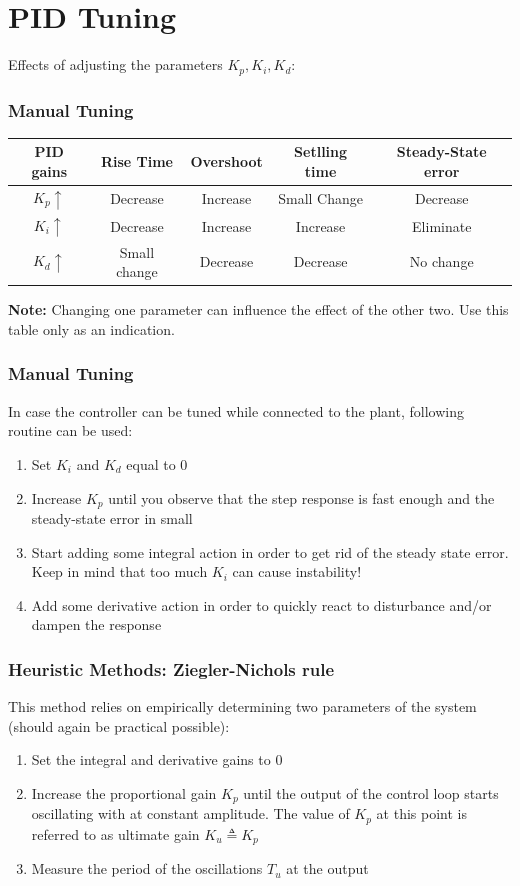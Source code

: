 \section{PID Tuning}

\begin{frame}
	Effects of adjusting the parameters $K_p, K_i, K_d$:
	\vspace{1em}
	\frametitle{Manual Tuning}
	{
	\small
	\begin{tabular}{c | c | c | c | c }
		PID gains	&	Rise Time 	&	Overshoot	&	Setlling time	&	Steady-State error \\
		\hline
		$K_p \uparrow$ & Decrease	&	Increase	&	Small Change	&	Decrease \\
		$K_i \uparrow$ & Decrease	&	Increase	&	Increase		&	Eliminate \\
		$K_d \uparrow$ & Small change &	Decrease	&	Decrease		&	No change \\
	\end{tabular}
	}
	\vspace{1em}
	
	\textbf{Note:} Changing one parameter can influence the effect of the other two. Use this table only as an indication.
\end{frame}

\begin{frame}
	\frametitle{Manual Tuning}
	In case the controller can be tuned while connected to the plant, following routine can be used:
	\begin{enumerate}
		\item Set $K_i$ and $K_d$ equal to 0
		\item Increase $K_p$ until you observe that the step response is fast enough and the steady-state error in small
		\item Start adding some integral action in order to get rid of the steady state error. Keep in mind that too much $K_i$ can cause instability!
		\item Add some derivative action in order to quickly react to disturbance and/or dampen the response
		
	\end{enumerate}
\end{frame}


\begin{frame}
	\frametitle{Heuristic Methods: Ziegler-Nichols rule}
		This method relies on empirically determining two parameters of the system (should again be practical possible):
		\begin{enumerate}
			\item Set the integral and derivative gains to 0
			\item Increase the proportional gain $K_p$ until the output of the control loop starts oscillating with at constant amplitude. The value of $K_p$ at this point is referred to as ultimate gain $K_u \triangleq K_p$
			\item Measure the period of the oscillations $T_u$ at the output 
		\end{enumerate}
\end{frame}

